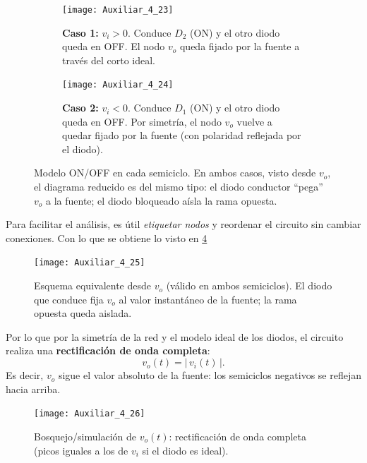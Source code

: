 \documentclass[
  11pt,
  letterpaper,
   addpoints,
   answers
  ]{exam}
\begin{document}
\begin{questions}
\begin{solution}
\begin{figure}[H]
  \centering
  \begin{subfigure}[b]{0.48\textwidth}
    \centering
    \texttt{[image: Auxiliar\_4\_23]}
    \caption{\textbf{Caso 1:} \(v_i>0\). Conduce \(D_2\) (ON) y el otro diodo queda en OFF. El nodo \(v_o\) queda fijado por la fuente a través del corto ideal.}
    \label{fig:resolucion4.2a}
  \end{subfigure}\hfill
  \begin{subfigure}[b]{0.48\textwidth}
    \centering
    \texttt{[image: Auxiliar\_4\_24]}
    \caption{\textbf{Caso 2:} \(v_i<0\). Conduce \(D_1\) (ON) y el otro diodo queda en OFF. Por simetría, el nodo \(v_o\) vuelve a quedar fijado por la fuente (con polaridad reflejada por el diodo).}
    \label{fig:resolucion4.2b}
  \end{subfigure}
  \caption{Modelo ON/OFF en cada semiciclo. En ambos casos, visto desde \(v_o\), el diagrama reducido es del mismo tipo: el diodo conductor “pega” \(v_o\) a la fuente; el diodo bloqueado aísla la rama opuesta.}
  \label{fig:resolucion4.2}
\end{figure}

Para facilitar el análisis, es útil \emph{etiquetar nodos} y reordenar el circuito sin cambiar conexiones. Con lo que se obtiene lo visto en \ref{fig:equivalente-vo-2}
\begin{figure}[H]
  \centering
  \texttt{[image: Auxiliar\_4\_25]}
  \caption{Esquema equivalente desde \(v_o\) (válido en ambos semiciclos). El diodo que conduce fija \(v_o\) al valor instantáneo de la fuente; la rama opuesta queda aislada.}
  \label{fig:equivalente-vo-2}
\end{figure}

Por lo que por la simetría de la red y el modelo ideal de los diodos, el circuito realiza una \textbf{rectificación de onda completa}:
\[
  v_o(t)=|\,v_i(t)\,|.
\]
Es decir, \(v_o\) sigue el valor absoluto de la fuente: los semiciclos negativos se reflejan hacia arriba.

\begin{figure}[H]
  \centering
  \texttt{[image: Auxiliar\_4\_26]}
  \caption{Bosquejo/simulación de \(v_o(t)\): rectificación de onda completa (picos iguales a los de \(v_i\) si el diodo es ideal).}
  \label{fig:voltaje-salida-4.2}
\end{figure}

\end{solution}
\end{questions}
\end{document}
